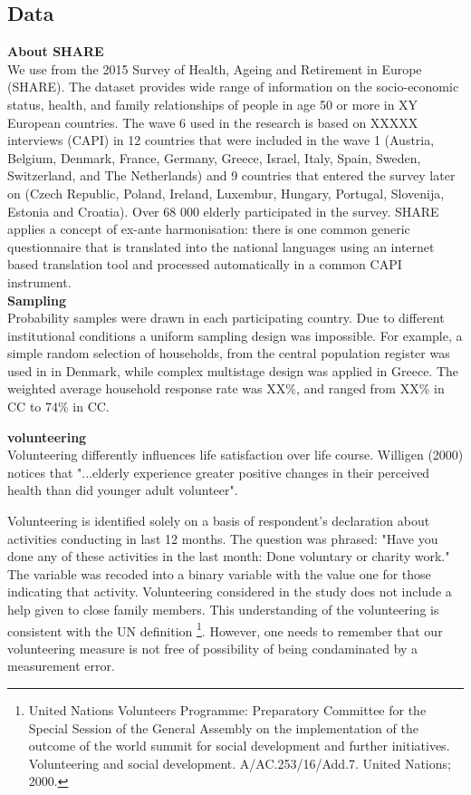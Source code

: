 \documentclass[10pt, letterpaper]{article}
\begin{document}
\begin{spacing}{1.4}
\section{Data}

\textbf{About SHARE} \\
We use from the 2015 Survey of Health, Ageing and Retirement in Europe (SHARE). The dataset provides wide range of information on the socio-economic status, health, and family relationships of people in age 50 or more in XY European countries. The wave 6 used in the research is based on XXXXX interviews (CAPI) in 12 countries that were included in the wave 1 (Austria, Belgium, Denmark, France, Germany, Greece, Israel, Italy, Spain, Sweden, Switzerland, and The Netherlands) and 9 countries that entered the survey later on (Czech Republic, Poland, Ireland, Luxembur, Hungary, Portugal, Slovenija, Estonia and Croatia). Over 68 000 elderly  participated in the survey. SHARE applies a concept of ex-ante harmonisation: there is one common generic questionnaire that is translated into the national languages using an internet based translation tool and processed automatically in a common CAPI instrument. \\

\textbf{Sampling} \\
Probability samples were drawn in each participating country. Due to different institutional conditions a uniform sampling design was impossible. For example, a simple random selection of
households, from the central population register was used in in Denmark, while complex multistage design was applied in Greece. The weighted average household response rate was
XX\%, and ranged from XX\% in CC to 74\% in CC. 


\textbf{volunteering} \\
Volunteering differently influences life satisfaction over life course. Willigen (2000) notices that "...elderly experience greater positive changes in their perceived health than did younger adult volunteer".

Volunteering is identified solely on a basis of respondent's declaration about activities conducting in last 12 months. The question was phrased: "Have you done any of these activities in the last month: Done voluntary or charity work." The variable was recoded into a binary variable with the value one for those indicating that activity. Volunteering considered in the study does not include a help given to close family members. This understanding of the volunteering is consistent with the UN definition \footnote{United Nations Volunteers Programme: Preparatory Committee for the Special Session of the General Assembly on the implementation of the outcome of the world summit for social development and further initiatives. Volunteering and social development. A/AC.253/16/Add.7. United Nations; 2000.}. However, one needs to remember that our volunteering measure is not free of possibility of being condaminated by a measurement error. 


\end{spacing}
\end{document}
